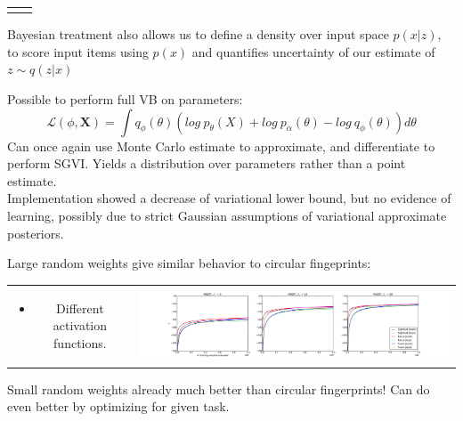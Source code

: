 \documentclass[landscape,a0b,final,a4resizeable]{include/a0poster}
\begin{document}
\begin{poster}
\begin{multicols}{3}
\begin{tabular}{cc}
\begin{minipage}[c]{0.5\columnwidth}
\begin{center}
\end{center}
\end{minipage}
\end{tabular}
Bayesian treatment also allows us to define a density over input space $p(x|z)$, to score input items using $p(x)$ and quantifies uncertainty of our estimate of $z\sim q(z|x)$

\newpage %


Possible to perform full VB on parameters:
$$\mathcal{L}(\phi, \mathbf{X}) = \int q_\phi(\theta)(log\ p_\theta(X) + log\ p_\alpha(\theta) - log\ q_\phi(\theta)) d\theta$$
Can once again use Monte Carlo estimate to approximate, and differentiate to perform SGVI. Yields a distribution over parameters rather than a point estimate.\\
Implementation showed a decrease of variational lower bound, but no evidence of learning, possibly due to strict Gaussian assumptions of variational approximate posteriors.

Large random weights give similar behavior to circular fingeprints:
\begin{tabular}{cc}
\begin{minipage}[c]{0.25\columnwidth}
\begin{itemize}
\item Different activation functions.
\end{itemize}
\end{minipage} & 
\begin{minipage}[c]{0.75\columnwidth}
\includegraphics[width=1.0\columnwidth, clip, trim=4mm 0mm 4mm 4mm]{../res/mnist_activations}
\end{minipage}
\end{tabular}

\vspace{0.5em}

Small random weights already much better than circular fingerprints!
Can do even better by optimizing for given task.

\vspace{1in}



\end{multicols}
\end{poster}
\end{document}
